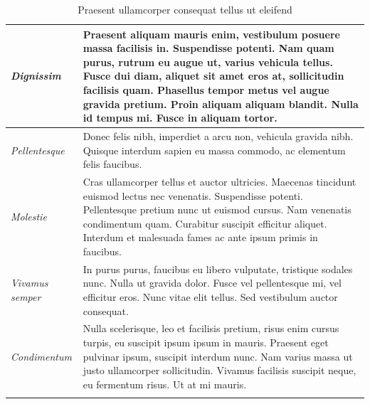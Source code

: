 \begin{center}
\begin{longtable}{ | p{} | p{} | }
				\emph{Dignissim}
				& Praesent aliquam mauris enim, vestibulum posuere massa facilisis in. Suspendisse potenti. Nam quam purus, rutrum eu augue ut, varius vehicula tellus. Fusce dui diam, aliquet sit amet eros at, sollicitudin facilisis quam. Phasellus tempor metus vel augue gravida pretium. Proin aliquam aliquam blandit. Nulla id tempus mi. Fusce in aliquam tortor.
				\\ \hline
				
				\emph{Pellentesque}
				& Donec felis nibh, imperdiet a arcu non, vehicula gravida nibh. Quisque interdum sapien eu massa commodo, ac elementum felis faucibus.
				\\ \hline
				
				\emph{Molestie}
				& Cras ullamcorper tellus et auctor ultricies. Maecenas tincidunt euismod lectus nec venenatis. Suspendisse potenti. Pellentesque pretium nunc ut euismod cursus. Nam venenatis condimentum quam. Curabitur suscipit efficitur aliquet. Interdum et malesuada fames ac ante ipsum primis in faucibus.
				\\ \hline
				
				\emph{Vivamus semper}
				& In purus purus, faucibus eu libero vulputate, tristique sodales nunc. Nulla ut gravida dolor. Fusce vel pellentesque mi, vel efficitur eros. Nunc vitae elit tellus. Sed vestibulum auctor consequat. 
				\\ \hline
				
				\emph{Condimentum}
				& Nulla scelerisque, leo et facilisis pretium, risus enim cursus turpis, eu suscipit ipsum ipsum in mauris. Praesent eget pulvinar ipsum, suscipit interdum nunc. Nam varius massa ut justo ullamcorper sollicitudin. Vivamus facilisis suscipit neque, eu fermentum risus. Ut at mi mauris.
				\\ \hline
				
				\caption{Praesent ullamcorper consequat tellus ut eleifend}
				\label{tab:example-3}		
			\end{longtable}
		\end{center}
\fi
